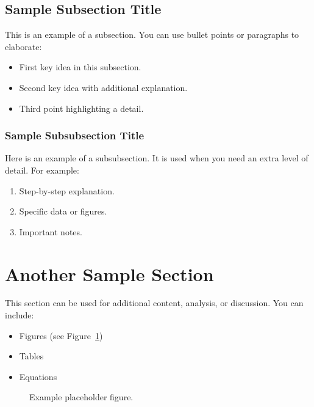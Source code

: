 \documentclass[12pt]{article}
\begin{document}
\subsection{Sample Subsection Title}
This is an example of a subsection.  
You can use bullet points or paragraphs to elaborate:
\begin{itemize}
    \item First key idea in this subsection.
    \item Second key idea with additional explanation.
    \item Third point highlighting a detail.
\end{itemize}

\subsubsection{Sample Subsubsection Title}
Here is an example of a subsubsection.  
It is used when you need an extra level of detail.  
For example:
\begin{enumerate}
    \item Step-by-step explanation.
    \item Specific data or figures.
    \item Important notes.
\end{enumerate}

\section{Another Sample Section}
This section can be used for additional content, analysis, or discussion.  
You can include:
\begin{itemize}
    \item Figures (see Figure~\ref{fig:sample_fig})
    \item Tables
    \item Equations
\end{itemize}

\begin{figure}[H]       %
    \centering

    \fbox{\rule{0pt}{2in}\rule{2in}{0pt}}
    \caption{Example placeholder figure.}
    \label{fig:sample_fig}
\end{figure}
\end{document}
